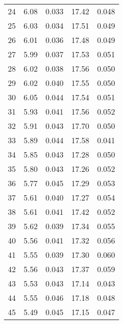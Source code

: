 \begin{table}
\begin{tabular}{c|ll|ll}
24 & 6.08 & 0.033 & 17.42 & 0.048 \\
25 & 6.03 & 0.034 & 17.51 & 0.049 \\
26 & 6.01 & 0.036 & 17.48 & 0.049 \\
27 & 5.99 & 0.037 & 17.53 & 0.051 \\
28 & 6.02 & 0.038 & 17.56 & 0.050 \\
29 & 6.02 & 0.040 & 17.55 & 0.050 \\
30 & 6.05 & 0.044 & 17.54 & 0.051 \\
31 & 5.93 & 0.041 & 17.56 & 0.052 \\
32 & 5.91 & 0.043 & 17.70 & 0.050 \\
33 & 5.89 & 0.044 & 17.58 & 0.041 \\
34 & 5.85 & 0.043 & 17.28 & 0.050 \\
35 & 5.80 & 0.043 & 17.26 & 0.052 \\
36 & 5.77 & 0.045 & 17.29 & 0.053 \\
37 & 5.61 & 0.040 & 17.27 & 0.054 \\
38 & 5.61 & 0.041 & 17.42 & 0.052 \\
39 & 5.62 & 0.039 & 17.34 & 0.055 \\
40 & 5.56 & 0.041 & 17.32 & 0.056 \\
41 & 5.55 & 0.039 & 17.30 & 0.060 \\
42 & 5.56 & 0.043 & 17.37 & 0.059 \\
43 & 5.53 & 0.043 & 17.14 & 0.043 \\
44 & 5.55 & 0.046 & 17.18 & 0.048 \\
45 & 5.49 & 0.045 & 17.15 & 0.047 \\
               \hline
        \end{tabular}
    \end{table}
    \clearpage

